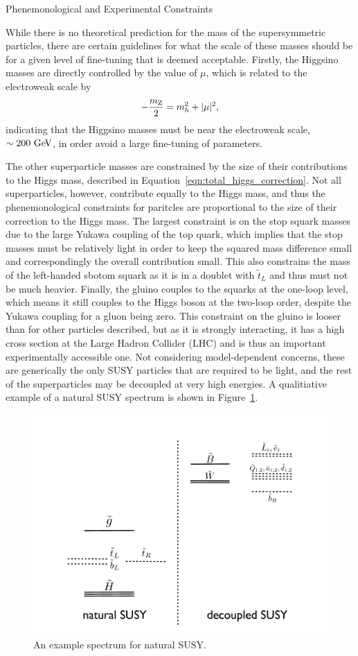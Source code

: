 \begin{section}{Phenemonological and Experimental Constraints}

While there is no theoretical prediction for the mass of the supersymmetric particles, there are certain guidelines for what the scale of these masses should be for a given level of fine-tuning that is deemed acceptable.
Firstly, the Higgsino masses are directly controlled by the value of $\mu$, which is related to the electroweak scale by
\begin{align}
-\frac{m_{\mathrm{Z}}}{2} = m_{h}^2 + |\mu|^2,
\end{align}
indicating that the Higgsino masses must be near the electroweak scale, $\sim 200~\mathrm{Ge\kern -0.1em V}$, in order avoid a large fine-tuning of parameters.

The other superparticle masses are constrained by the size of their contributions to the Higgs mass, described in Equation~\ref{eqn:total_higgs_correction}.
Not all superparticles, however, contribute equally to the Higgs mass, and thus the phenemonological constraints for paritcles are proportional to the size of their correction to the Higgs mass.
The largest constraint is on the stop squark masses due to the large Yukawa coupling of the top quark, which implies that the stop masses must be relatively light in order to keep the squared mass difference small and correspondingly the overall contribution small.
This also constrains the mass of the left-handed sbotom squark as it is in a doublet with $\tilde{t}_L$ and thus must not be much heavier.
Finally, the gluino couples to the squarks at the one-loop level, which means it still couples to the Higgs boson at the two-loop order, despite the Yukawa coupling for a gluon being zero.
This constraint on the gluino is looser than for other particles described, but as it is strongly interacting, it has a high cross section at the Large Hadron Collider (LHC) and is thus an important experimentally accessible one.
Not considering model-dependent concerns, these are generically the only SUSY particles that are required to be light, and the rest of the superparticles may be decoupled at very high energies.
A qualitiative example of a natural SUSY spectrum is shown in Figure~\ref{fig:natural_susy_spectrum}.

\begin{figure}[tbp!]
\begin{center}
\includegraphics[angle=0,width=0.60\columnwidth]{fig/natural_susy_spectrum.png}
\end{center}
\caption{An example spectrum for natural SUSY.}
\label{fig:natural_susy_spectrum}
\end{figure}


\end{section}
